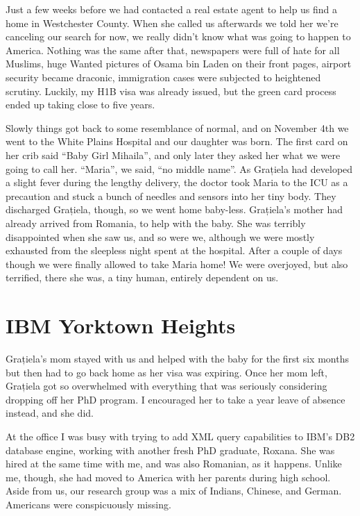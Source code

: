\documentclass[12pt]{book}
\begin{document}
Just a few weeks before we had contacted a real estate agent to help us
find a home in Westchester County. When she called us afterwards we told
her we're canceling our search for now, we really didn't know what was
going to happen to America. Nothing was the same after that, newspapers
were full of hate for all Muslims, huge Wanted pictures of Osama bin
Laden on their front pages, airport security became draconic,
immigration cases were subjected to heightened scrutiny. Luckily, my H1B
visa was already issued, but the green card process ended up taking
close to five years.

Slowly things got back to some resemblance of normal, and on November
4th we went to the White Plains Hospital and our daughter was born. The
first card on her crib said ``Baby Girl Mihaila'', and only later they
asked her what we were going to call her. ``Maria'', we said, ``no
middle name''. As Grațiela had developed a slight fever during the
lengthy delivery, the doctor took Maria to the ICU as a precaution and
stuck a bunch of needles and sensors into her tiny body. They discharged
Grațiela, though, so we went home baby-less. Grațiela's mother had
already arrived from Romania, to help with the baby. She was terribly
disappointed when she saw us, and so were we, although we were mostly
exhausted from the sleepless night spent at the hospital. After a couple
of days though we were finally allowed to take Maria home! We were
overjoyed, but also terrified, there she was, a tiny human, entirely
dependent on us.


\section{IBM Yorktown Heights}

Grațiela's mom stayed with us and helped with the baby for the first six
months but then had to go back home as her visa was expiring. Once her
mom left, Grațiela got so overwhelmed with everything that was seriously
considering dropping off her PhD program. I encouraged her to take a
year leave of absence instead, and she did.

At the office I was busy with trying to add XML query capabilities to
IBM's DB2 database engine, working with another fresh PhD graduate,
Roxana. She was hired at the same time with me, and was also Romanian,
as it happens. Unlike me, though, she had moved to America with her
parents during high school. Aside from us, our research group was a mix
of Indians, Chinese, and German. Americans were conspicuously missing.
\end{document}
